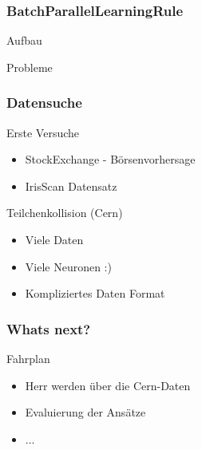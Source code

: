 \documentclass[18pt]{beamer}
\begin{document}
		\begin{frame}[c]\frametitle{BatchParallelLearningRule}
		\begin{block}{Aufbau}
			
		\end{block}
		\begin{block}{Probleme}
		
		\end{block}
	\end {frame}
	
	\begin{frame}[c]\frametitle{Datensuche}
		\begin{block}{Erste Versuche}
		    \begin{itemize}
		    	\item StockExchange - Börsenvorhersage
		    	\item IrisScan Datensatz
		    \end{itemize}
		\end{block}
		\begin{block}{Teilchenkollision (Cern)}
		    \begin{itemize}
		    	\item Viele Daten
		    	\item Viele Neuronen :)
		    	\item Kompliziertes Daten Format
		    \end{itemize}
		\end{block}
	\end{frame}
	
	\begin{frame}[c]\frametitle{Whats next?}
		\begin{block}{Fahrplan}
		    \begin{itemize}
		    	\item Herr werden über die Cern-Daten
		    	\item Evaluierung der Ansätze
		    	\item ...
		    \end{itemize}
		\end{block}
	\end{frame}
\end{document}
